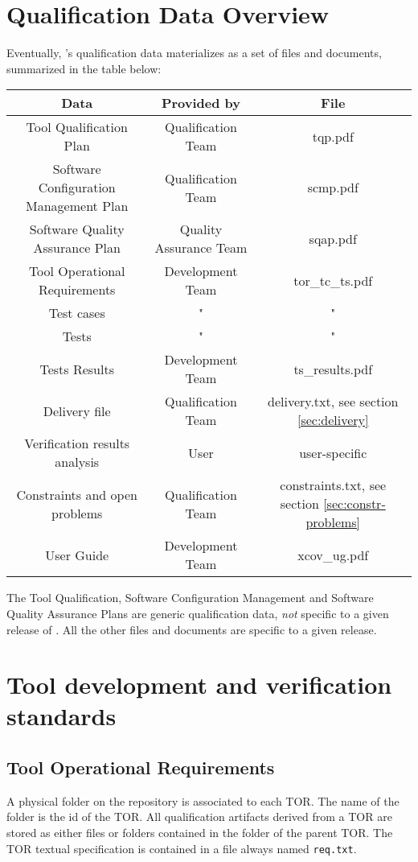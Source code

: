 \documentclass {report}
\begin{document}
\section{Qualification Data Overview}
\label{sec:qd-overview}

Eventually, \xcov{}'s qualification data materializes as a set of files and
documents, summarized in the table below:

\begin{tabular}{|c|c|c|}
\hline
\textbf{Data} & \textbf{Provided by} & \textbf{File} \\ \hline
Tool Qualification Plan & Qualification Team & tqp.pdf \\ \hline
Software Configuration Management Plan & Qualification Team & scmp.pdf \\ \hline
Software Quality Assurance Plan & Quality Assurance Team & sqap.pdf \\ \hline
Tool Operational Requirements & Development Team & tor\_tc\_ts.pdf \\ \hline
Test cases & " & " \\ \hline
Tests & " & " \\ \hline
Tests Results & Development Team & ts\_results.pdf \\ \hline
Delivery file & Qualification Team & delivery.txt, see section \ref{sec:delivery} \\ \hline
Verification results analysis & User & user-specific \\ \hline
Constraints and open problems & Qualification Team & constraints.txt, see section \ref{sec:constr-problems} \\ \hline
\xcov{} User Guide & Development Team & xcov\_ug.pdf \\ \hline
\end{tabular}

The Tool Qualification, Software Configuration Management and Software Quality
Assurance Plans are generic qualification data, \emph{not} specific to a given
release of \xcov{}.
%
All the other files and documents are specific to a given \xcov{}
release.

\section{Tool development and verification standards}
\subsection{Tool Operational Requirements}
A physical folder on the repository is associated to each TOR. The name of the folder is the id of the TOR. All qualification artifacts derived from a TOR are stored as either files or folders contained in the folder of the parent TOR. The TOR textual specification is contained in a file always named \texttt{req.txt}.
\end{document}
